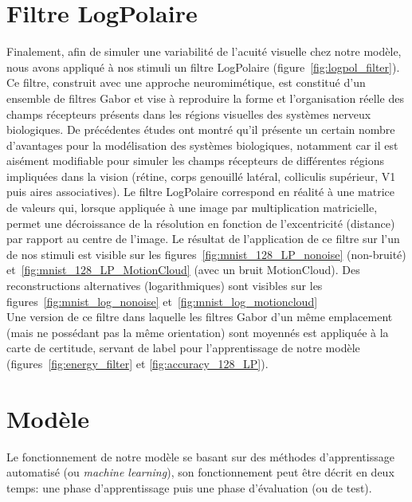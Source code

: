 \section{Filtre LogPolaire}
Finalement, afin de simuler une variabilité de l'acuité visuelle chez notre modèle, nous avons appliqué à nos stimuli un filtre LogPolaire (figure~\ref{fig:logpol_filter}).
Ce filtre, construit avec une approche neuromimétique, est constitué d'un ensemble de filtres Gabor et vise à reproduire la forme et l'organisation réelle des champs récepteurs présents dans les régions visuelles des systèmes nerveux biologiques. 
De précédentes études ont montré qu'il présente un certain nombre d'avantages pour la modélisation des systèmes biologiques, notamment car il est aisément modifiable pour simuler les champs récepteurs de différentes régions impliquées dans la vision (rétine, corps genouillé latéral, colliculis supérieur, V1 puis aires associatives).
Le filtre LogPolaire correspond en réalité à une matrice de valeurs qui, lorsque appliquée à une image par multiplication matricielle, permet une décroissance de la résolution en fonction de l'excentricité (distance) par rapport au centre de l'image. 
Le résultat de l'application de ce filtre sur l'un de nos stimuli est visible sur les figures~\ref{fig:mnist_128_LP_nonoise} (non-bruité) et~\ref{fig:mnist_128_LP_MotionCloud} (avec un bruit MotionCloud). Des reconstructions alternatives (logarithmiques) sont visibles sur les figures~\ref{fig:mnist_log_nonoise} et~\ref{fig:mnist_log_motioncloud} \autocite{Freeman2011} \\
Une version de ce filtre dans laquelle les filtres Gabor d'un même emplacement (mais ne possédant pas la même orientation) sont moyennés est appliquée à la carte de certitude, servant de label pour l'apprentissage de notre modèle (figures~\ref{fig:energy_filter} et \ref{fig:accuracy_128_LP}).

\section{Modèle}
Le fonctionnement de notre modèle se basant sur des méthodes d'apprentissage automatisé (ou \textit{machine learning}), son fonctionnement peut être décrit en deux temps: une phase d'apprentissage puis une phase d'évaluation (ou de test). \\



